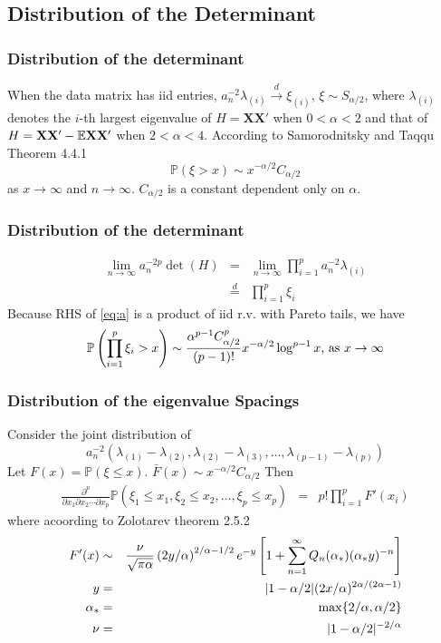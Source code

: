 \documentclass{beamer}
\renewcommand{\P}{
\mathbb P
}
\begin{document}
\subsection{Distribution of the Determinant}
\begin{frame}
\frametitle{Distribution of the determinant}
When the data matrix has iid entries, $a_n^{-2} \lambda_{(i)} \overset{d}{\to}
\xi_{(i)}$, $\xi \sim S_{\alpha/2}$, where $\lambda_{(i)}$ denotes
the $i$-th largest eigenvalue of $H = \mathbf{XX'}$ when $0 < \alpha < 2$ and that
of $H = \mathbf{XX'} - \mathbb{E} \mathbf{XX'}$ when $2 < \alpha < 4$. According to Samorodnitsky and
Taqqu\cite{SamorodnitskyTaqqu1994} Theorem 4.4.1
$$
\P(\xi > x) \sim x^{-\alpha/2} C_{\alpha/2}
$$
as $x \to \infty$ and $n \to \infty$. $C_{\alpha/2}$ is a constant
dependent only on $\alpha$.
\end{frame}

\begin{frame}
  \frametitle{Distribution of the determinant}
  \begin{eqnarray*}
    \lim_{n \to \infty} a_n^{-2p} \det(H) &=& \lim_{n \to \infty}
    \prod_{i=1}^p a_n^{-2} \lambda_{(i)} \nonumber \\
    &\overset{d}{=}& \prod_{i=1}^p \xi_{i} \label{eq:a}
  \end{eqnarray*}
  Because RHS of \eqref{eq:a} is a product of iid r.v. with Pareto
  tails, we have
  \[
  \P\left(
    \prod_{i=1}^p \xi_{i} > x
  \right) \sim {\alpha^{p-1} C_{\alpha/2}^p \over (p-1)!}  x^{-\alpha/2} \log^{p-1} x 
  \text{, as } x \to \infty
  \]
\end{frame}

\begin{frame}
  \frametitle{Distribution of the eigenvalue Spacings}
  Consider the joint distribution of
  \[
  a_n^{-2}(\lambda_{(1)} - \lambda_{(2)}, \lambda_{(2)} - \lambda_{(3)},
  \dots, \lambda_{(p-1)} - \lambda_{(p)})
  \]
  Let $F(x) = \P(\xi \leq x)$. $\bar{F}(x) \sim x^{-\alpha/2}
  C_{\alpha/2}$
Then
\begin{eqnarray*}
\frac{\partial^p}{\partial x_1\partial x_2 \cdots \partial x_p}
\P(\xi_1 \leq x_1, \xi_2 \leq x_2, \dots, \xi_p \leq x_p)
&=& p! \prod_{i=1}^p F'(x_i)
\end{eqnarray*}
where acoording to Zolotarev \cite{Zolotarev1983} theorem 2.5.2
\begin{eqnarray*}
  F'(x) &\sim& {\nu \over \sqrt{\pi \alpha}} \left(2y/\alpha\right)^{2/\alpha - 1/2}
  e^{-y} \left[
    1 + \sum_{n=1}^\infty Q_n(\alpha_*) (\alpha_* y)^{-n}
  \right] \\
  y &=& |1 - \alpha/2|(2x/\alpha)^{2\alpha/(2\alpha-1)}\\
  \alpha_* &=& \max\{2/\alpha, \alpha/2\} \\
  \nu &=& |1 - \alpha/2|^{-2/\alpha}
\end{eqnarray*}
\end{frame}
\end{document}
